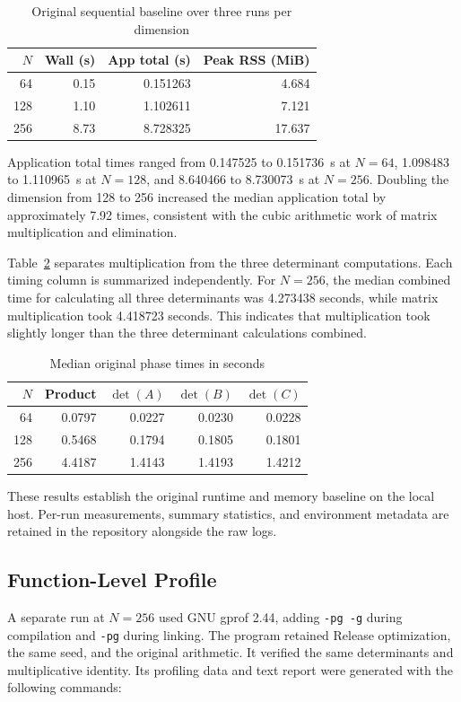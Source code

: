 \begin{table}[tb]
\centering
\caption{Original sequential baseline over three runs per dimension}
\label{tab:original-baseline}
\begin{tabular}{rrrr}
\hline
$N$ & Wall (s) & App total (s) & Peak RSS (MiB) \\
\hline
64 & 0.15 & 0.151263 & 4.684 \\
128 & 1.10 & 1.102611 & 7.121 \\
256 & 8.73 & 8.728325 & 17.637 \\
\hline
\end{tabular}
\end{table}

Application total times ranged from 0.147525 to 0.151736~s at $N=64$,
1.098483 to 1.110965~s at $N=128$, and 8.640466 to 8.730073~s at $N=256$.
Doubling the dimension from 128 to 256 increased the median application
total by approximately 7.92 times, consistent with the cubic arithmetic
work of matrix multiplication and elimination.

Table~\ref{tab:original-phases} separates multiplication from the three
determinant computations. Each timing column is summarized independently.
For $N=256$, the median combined time for calculating all three 
determinants was 4.273438 seconds, while matrix multiplication took 4.418723 seconds. 
This indicates that multiplication took slightly longer than the three determinant calculations combined.

\begin{table}[tb]
\centering
\caption{Median original phase times in seconds}
\label{tab:original-phases}
\begin{tabular}{rrrrr}
\hline
$N$ & Product & $\det(A)$ & $\det(B)$ & $\det(C)$ \\
\hline
64 & 0.0797 & 0.0227 & 0.0230 & 0.0228 \\
128 & 0.5468 & 0.1794 & 0.1805 & 0.1801 \\
256 & 4.4187 & 1.4143 & 1.4193 & 1.4212 \\
\hline
\end{tabular}
\end{table}

These results establish the original runtime and memory baseline on the
local host. Per-run measurements, summary statistics, and environment metadata
are retained in the repository alongside the raw logs.

\subsection{Function-Level Profile}
\label{sec:original-profile}
A separate run at $N=256$ used GNU gprof 2.44, adding \texttt{-pg -g} during
compilation and \texttt{-pg} during linking. The program retained Release
optimization, the same seed, and the original arithmetic. It verified the same
determinants and multiplicative identity. Its profiling data and text report
were generated with the following commands:


